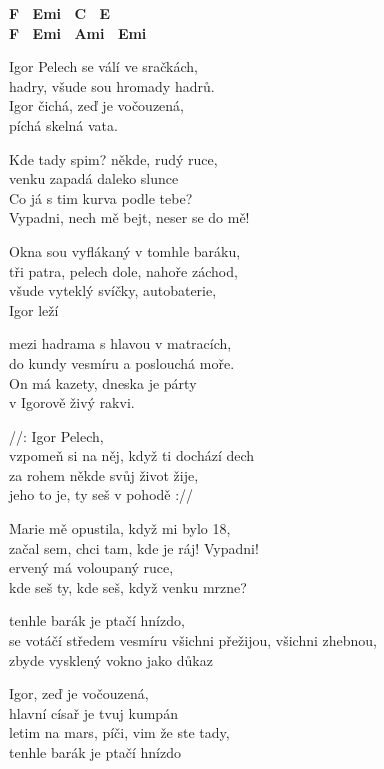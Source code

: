 
\re{}
\textbf{{\small F \ Emi \ C \ E \\
F \ Emi \ Ami \ Emi }}

\re{}
Igor Pelech se válí ve sračkách,\\
hadry, všude sou hromady hadrů.\\
Igor čichá, zeď je vočouzená,\\
píchá skelná vata.

\ve{}
Kde tady spim? někde, rudý ruce,\\
venku zapadá daleko slunce\\
Co já s tim kurva podle tebe?\\
Vypadni, nech mě bejt, neser se do mě!

Okna sou vyflákaný v tomhle baráku,\\
tři patra, pelech dole, nahoře záchod,\\
všude vyteklý svíčky, autobaterie,\\
Igor leží

mezi hadrama s hlavou v matracích,\\
do kundy vesmíru a poslouchá moře.\\
On má kazety, dneska je párty\\
v Igorově živý rakvi.

\cho{}
//: Igor Pelech,\\
vzpomeň si na něj, když ti dochází dech\\
za rohem někde svůj život žije,\\
jeho to je, ty seš v pohodě ://

\ve{}
Marie mě opustila, když mi bylo 18,\\
začal sem, chci tam, kde je ráj! Vypadni!\\
ervený má voloupaný ruce,\\
kde seš ty, kde seš, když venku mrzne?

tenhle barák je ptačí hnízdo,\\
se votáčí středem vesmíru
všichni přežijou, všichni zhebnou,\\
zbyde vysklený vokno jako důkaz

Igor, zeď je vočouzená,\\
hlavní císař je tvuj kumpán\\
letim na mars, píči, vim že ste tady,\\
tenhle barák je ptačí hnízdo


